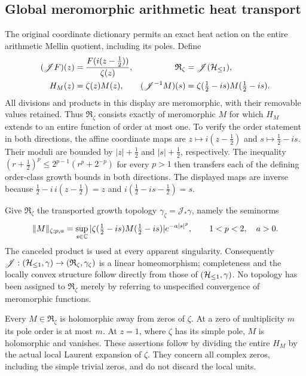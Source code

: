 \subsection{Global meromorphic arithmetic heat transport}
\label{sec:cq-meromorphic-arithmetic-heat}
The original coordinate dictionary permits an exact heat action on
the entire arithmetic Mellin quotient, including its poles. Define
\begin{equation}\label{eq:cq-meromorphic-J}
 \begin{aligned}
 (\mathscr JF)(z)&=\frac{F(i(z-\tfrac12))}{\zeta(z)},
 &\mathfrak R_\zeta&=\mathscr J(\mathcal H_{\leq 1}),\\
 H_M(z)&=\zeta(z)M(z),
 &(\mathscr J^{-1}M)(s)&=
       \zeta(\tfrac12-is)M(\tfrac12-is).
 \end{aligned}
\end{equation}
All divisions and products in this display are meromorphic, with
their removable values retained. Thus $\mathfrak R_\zeta$ consists
exactly of meromorphic $M$ for which $H_M$ extends to an entire
function of order at most one. To verify the order statement in
both directions, the affine coordinate maps are
$z\mapsto i(z-\tfrac12)$ and $s\mapsto\tfrac12-is$.
Their moduli are bounded by $|z|+\tfrac12$ and
$|s|+\tfrac12$, respectively. The inequality
$(r+\tfrac12)^p\leq2^{p-1}(r^p+2^{-p})$ for every $p>1$
then transfers each of the defining order-class growth bounds
in both directions. The displayed maps are inverse because
$\tfrac12-i\,i(z-\tfrac12)=z$ and
$i(\tfrac12-is-\tfrac12)=s$.

Give $\mathfrak R_\zeta$ the transported growth topology
$\gamma_\zeta=\mathscr J_*\gamma$, namely the seminorms
\begin{equation}\label{eq:cq-meromorphic-seminorms}
 \|M\|_{\zeta;p,a}
 =\sup_{s\in\mathbb C}
   |\zeta(\tfrac12-is)M(\tfrac12-is)|e^{-a|s|^p},
 \qquad 1<p<2,\quad a>0.
\end{equation}
The canceled product is used at every apparent singularity.
Consequently $\mathscr J:(\mathcal H_{\leq 1},\gamma)\to
(\mathfrak R_\zeta,\gamma_\zeta)$ is a linear homeomorphism;
completeness and the locally convex structure follow directly
from those of $(\mathcal H_{\leq 1},\gamma)$. No topology has been assigned
to $\mathfrak R_\zeta$ merely by referring to unspecified
convergence of meromorphic functions.

Every $M\in\mathfrak R_\zeta$ is holomorphic away from zeros
of $\zeta$. At a zero of multiplicity $m$ its pole order is at
most $m$. At $z=1$, where $\zeta$ has its simple pole, $M$
is holomorphic and vanishes. These assertions follow by dividing
the entire $H_M$ by the actual local Laurent expansion of
$\zeta$. They concern all complex zeros, including the simple
trivial zeros, and do not discard the local units.

